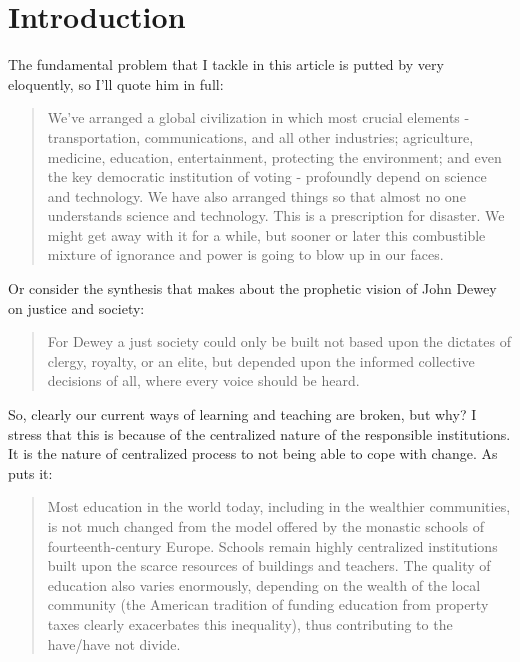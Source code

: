 \section{Introduction}

The fundamental problem that I tackle in this article is putted by \cite{sagan_1996__candle_in_dark}  
very eloquently, so I'll quote him in full:

\begin{quotation}
    We've arranged a global civilization in which most crucial elements -
    transportation, communications, and all other industries; agriculture,
    medicine, education, entertainment, protecting the environment; and even
    the key democratic institution of voting - profoundly depend on science and
    technology. We have also arranged things so that almost no one understands
    science and technology. This is a prescription for disaster. We might get
    away with it for a while, but sooner or later this combustible mixture of
    ignorance and power is going to blow up in our faces.
\end{quotation}

Or consider the synthesis that \cite{education:cavallo__models_of_growth} makes
about the prophetic vision of John Dewey on justice and society:

\begin{quote}
    For Dewey a just society could only be built not based upon the dictates of
    clergy, royalty, or an elite, but depended upon the informed collective
    decisions of all, where every voice should be heard.
\end{quote}

So, clearly our current ways of learning and teaching are broken, but why? I
stress that this is because of the centralized nature of the responsible
institutions. It is the nature of centralized process to not being able to cope
with change. As \cite{futurism:kurzweil_singularity_is_near} puts it:

\begin{quotation}
    Most education in the world today, including in the wealthier communities,
    is not much changed from the model offered by the monastic schools of
    fourteenth-century Europe. Schools remain highly centralized institutions
    built upon the scarce resources of buildings and teachers. The quality of
    education also varies enormously, depending on the wealth of the local
    community (the American tradition of funding education from property taxes
    clearly exacerbates this inequality), thus contributing to the have/have not
    divide.
\end{quotation}

